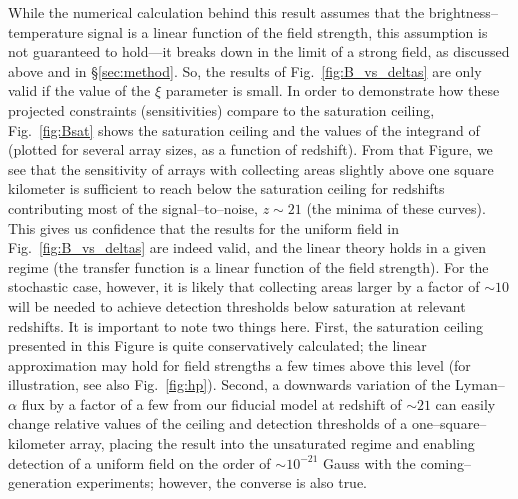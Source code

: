 While the numerical calculation behind this result assumes that the brightness--temperature signal is a linear function of the field strength, this assumption is not guaranteed to hold---it breaks down in the limit of a strong field, as discussed above and in \S\ref{sec:method}. So, the results of Fig.~\ref{fig:B_vs_deltas} are only valid if the value of the $\xi$ parameter is small. In order to demonstrate how these projected constraints (sensitivities) compare to the saturation ceiling, Fig.~\ref{fig:Bsat} shows the saturation ceiling and the values of the integrand of \eq{\ref{eq:fisher_patch}} (plotted for several array sizes, as a function of redshift). From that Figure, we see that the sensitivity of arrays with collecting areas slightly above one square kilometer is sufficient to reach below the saturation ceiling for redshifts contributing most of the signal--to--noise, $z\sim21$ (the minima of these curves). This gives us confidence that the results for the uniform field in Fig.~\ref{fig:B_vs_deltas} are indeed valid, and the linear theory holds in a given regime (the transfer function is a linear function of the field strength). For the stochastic case, however, it is likely that collecting areas larger by a factor of $\sim 10$ will be needed to achieve detection thresholds below saturation at relevant redshifts. It is important to note two things here. First, the saturation ceiling presented in this Figure is quite conservatively calculated; the linear approximation may hold for field strengths a few times above this level (for illustration, see also Fig.~\ref{fig:hp}). Second, a downwards variation of the Lyman--$\alpha$ flux by a factor of a few from our fiducial model at redshift of $\sim 21$ can easily change relative values of the ceiling and detection thresholds of a one--square--kilometer array, placing the result into the unsaturated regime and enabling detection of a uniform field on the order of $\sim 10^{-21}$ Gauss with the coming--generation experiments; however, the converse is also true. 
